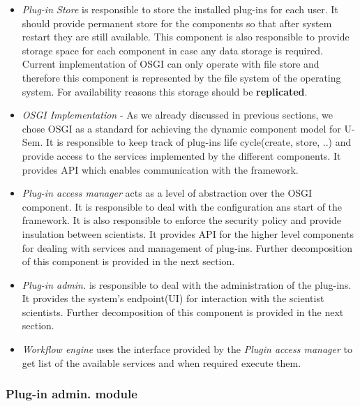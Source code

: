 \begin{itemize}

\item \textit{Plug-in Store} is responsible to store the installed plug-ins for each user. It should provide permanent store for the components so that after system restart they are still available. This component is also responsible to provide storage space for each component in case any data storage is required. Current implementation of OSGI can only operate with file store and therefore this component is represented by the file system of the operating system. For availability reasons this storage should be \textbf{replicated}.

\item \textit{OSGI Implementation} - As we already discussed in previous sections, we chose OSGI as a standard for achieving the dynamic component model for U-Sem. It is responsible to keep track of plug-ins life cycle(create, store, ..) and provide access to the services implemented by the different components. It provides API which enables communication with the framework.

\item \textit{Plug-in access manager} acts as a level of abstraction over the OSGI component. It is responsible to deal with the configuration ans start of the framework. It is also responsible to enforce the security policy and provide insulation between scientists. It provides API for the higher level components for dealing with services and management of plug-ins. Further decomposition of this component is provided in the next section.

\item \textit{Plug-in admin.} is responsible to deal with the administration of the plug-ins. It provides the system's endpoint(UI) for interaction with the scientist scientists. Further decomposition of this component is provided in the next section. 

\item \textit{Workflow engine} uses the interface provided by the \textit{Plugin access manager} to get list of the available services and when required execute them.
	
\end{itemize}


\subsubsection{Plug-in admin. module}

